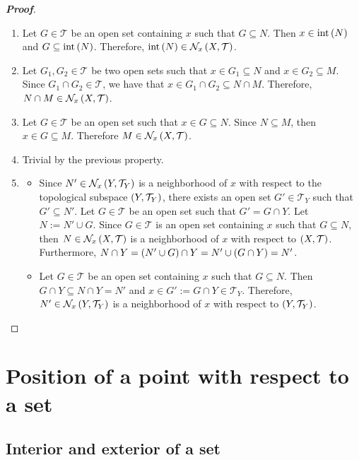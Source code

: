 \begin{proposition}
  \begin{proof}[\rm\textbf{Proof}]
    \hfill
    \begin{enumerate}
      \item Let $G\in\mathcal{T}$ be an open set containing $x$ such that $G\subseteq N$. Then $x\in\operatorname{int}\left(N\right)$ and $G\subseteq\operatorname{int}\left(N\right)$. Therefore, $\operatorname{int}\left(N\right)\in\mathcal{N}_x\left(X,\mathcal{T}\right)$.
      \item Let $G_1,G_2\in\mathcal{T}$ be two open sets such that $x\in G_1\subseteq N$ and $x\in G_2\subseteq M$. Since $G_1\cap G_2\in\mathcal{T}$, we have that $x\in G_1\cap G_2\subseteq N\cap M$. Therefore, $N\cap M\in\mathcal{N}_x\left(X,\mathcal{T}\right)$.
      \item Let $G\in\mathcal{T}$ be an open set such that $x\in G\subseteq N$. Since $N\subseteq M$, then $x\in G\subseteq M$. Therefore $M\in\mathcal{N}_x\left(X,\mathcal{T}\right)$.
      \item Trivial by the previous property.
      \item \begin{itemize}
        \item[\boxed{\Rightarrow}] Since $N'\in\mathcal{N}_x\left(Y,\mathcal{T}_Y\right)$ is a neighborhood of $x$ with respect to the topological subspace $\left(Y,\mathcal{T}_Y\right)$, there exists an open set $G'\in\mathcal{T}_Y$ such that $G'\subseteq N'$. Let $G\in\mathcal{T}$ be an open set such that $G'=G\cap Y$. Let $N:=N'\cup G$. Since $G\in\mathcal{T}$ is an open set containing $x$ such that $G\subseteq N$, then $N\in\mathcal{N}_x\left(X,\mathcal{T}\right)$ is a neighborhood of $x$ with respect to $\left(X,\mathcal{T}\right)$. Furthermore, $N\cap Y=\left(N'\cup G\right)\cap Y=N'\cup\left(G\cap Y\right)=N'$.
        \item[\boxed{\Leftarrow}] Let $G\in\mathcal{T}$ be an open set containing $x$ such that $G\subseteq N$. Then $G\cap Y\subseteq N\cap Y=N'$ and $x\in G':=G\cap Y\in\mathcal{T}_Y$. Therefore, $N'\in\mathcal{N}_x\left(Y,\mathcal{T}_Y\right)$ is a neighborhood of $x$ with respect to $\left(Y,\mathcal{T}_Y\right)$.
      \end{itemize}
    \end{enumerate}
  \end{proof}
\end{proposition}

\section{Position of a point with respect to a set}

\subsection{Interior and exterior of a set}

